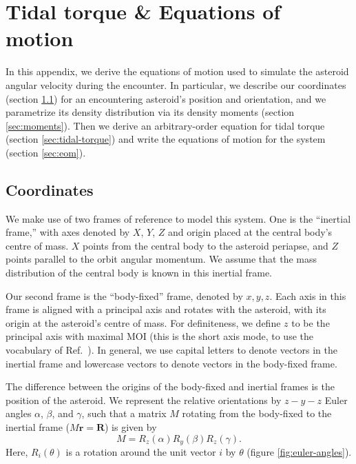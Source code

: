 


\appendix

\section{Tidal torque \& Equations of motion}
\label{app:eom}

In this appendix, we derive the equations of motion used to simulate the asteroid angular velocity during the encounter. In particular, we describe our coordinates (section \ref{sec:coordinates}) for an encountering asteroid's position and orientation, and we parametrize its density distribution via its density moments (section \ref{sec:moments}). Then we derive an arbitrary-order equation for tidal torque (section \ref{sec:tidal-torque}) and write the equations of motion for the system (section \ref{sec:eom}).

\subsection{Coordinates}
\label{sec:coordinates}

We make use of two frames of reference to model this system. One is the ``inertial frame,'' with axes denoted by $\unit{X}$, $\unit{Y}$, $\unit{Z}$ and origin placed at the central body's centre of mass. $\unit{X}$ points from the central body to the asteroid periapse, and $\unit{Z}$ points parallel to the orbit angular momentum. We assume that the mass distribution of the central body is known in this inertial frame.

Our second frame is the ``body-fixed'' frame, denoted by $\unit{x}, \unit{y}, \unit{z}$. Each axis in this frame is aligned with a principal axis and rotates with the asteroid, with its origin at the asteroid's centre of mass. For definiteness, we define $\unit{z}$ to be the principal axis with maximal MOI (this is the short axis mode, to use the vocabulary of Ref.~\cite{kaasalainen2001interpretation}). In general, we use capital letters to denote vectors in the inertial frame and lowercase vectors to denote vectors in the body-fixed frame.

The difference between the origins of the body-fixed and inertial frames is the position of the asteroid. We represent the relative orientations by $z-y-z$ Euler angles $\alpha$, $\beta$, and $\gamma$, such that a matrix $M$ rotating from the body-fixed to the inertial frame ($M\bm{r} = \bm{R}$) is given by
\begin{equation}
M = R_z(\alpha) R_y(\beta) R_z(\gamma).
\label{eqn:euler-angles}
\end{equation}
Here, $R_i(\theta)$ is a rotation around the unit vector $i$ by $\theta$ (figure \ref{fig:euler-angles}).

